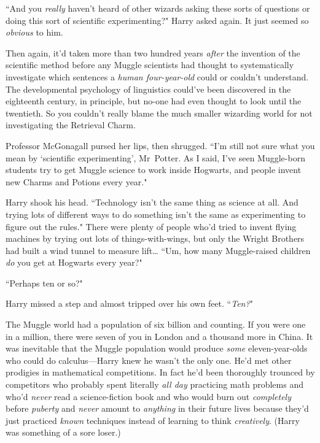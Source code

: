 ``And you \emph{really} haven't heard of other wizards asking these sorts of questions or doing this sort of scientific experimenting?" Harry asked again. It just seemed so \emph{obvious} to him.

Then again, it'd taken more than two hundred years \emph{after} the invention of the scientific method before any Muggle scientists had thought to systematically investigate which sentences a \emph{human four-year-old} could or couldn't understand. The developmental psychology of linguistics could've been discovered in the eighteenth century, in principle, but no-one had even thought to look until the twentieth. So you couldn't really blame the much smaller wizarding world for not investigating the Retrieval Charm.

Professor McGonagall pursed her lips, then shrugged. ``I'm still not sure what you mean by `scientific experimenting', Mr~Potter. As I said, I've seen Muggle-born students try to get Muggle science to work inside Hogwarts, and people invent new Charms and Potions every year."

Harry shook his head. ``Technology isn't the same thing as science at all. And trying lots of different ways to do something isn't the same as experimenting to figure out the rules." There were plenty of people who'd tried to invent flying machines by trying out lots of things-with-wings, but only the Wright Brothers had built a wind tunnel to measure lift{\ldots} ``Um, how many Muggle-raised children \emph{do} you get at Hogwarts every year?"

``Perhaps ten or so?"

Harry missed a step and almost tripped over his own feet. ``\emph{Ten?}"

The Muggle world had a population of six billion and counting. If you were one in a million, there were seven of you in London and a thousand more in China. It was inevitable that the Muggle population would produce \emph{some} eleven-year-olds who could do calculus—Harry knew he wasn't the only one. He'd met other prodigies in mathematical competitions. In fact he'd been thoroughly trounced by competitors who probably spent literally \emph{all day} practicing math problems and who'd \emph{never} read a science-fiction book and who would burn out \emph{completely} before \emph{puberty} and \emph{never} amount to \emph{anything} in their future lives because they'd just practiced \emph{known} techniques instead of learning to think \emph{creatively}. (Harry was something of a sore loser.)

